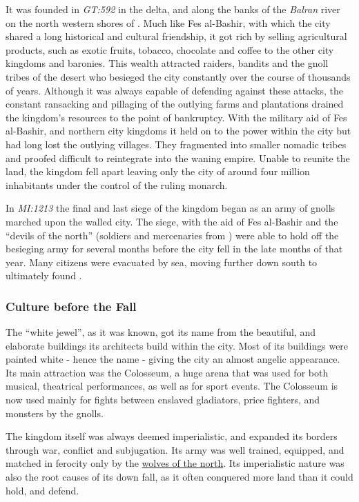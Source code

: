 It was founded in \emph{GT:592} in the delta, and along the banks of the
\emph{Balran} river on the north western shores of . Much
like Fes al-Bashir, with which the city shared a long historical and cultural
friendship, it got rich by selling agricultural products, such as exotic
fruits, tobacco, chocolate and coffee to the other city kingdoms and
baronies. This wealth attracted raiders, bandits and the gnoll tribes of the
desert who besieged the city constantly over the course of thousands of
years. Although it was always capable of defending against these attacks, the
constant ransacking and pillaging of the outlying farms and plantations
drained the kingdom's resources to the point of bankruptcy. With the military
aid of Fes al-Bashir, and northern city kingdoms it held on to the power within
the city but had long lost the outlying villages. They fragmented into smaller
nomadic tribes and proofed difficult to reintegrate into the waning
empire. Unable to reunite the land, the kingdom fell apart leaving only the
city of around four million inhabitants under the control of the ruling
monarch.

In \emph{MI:1213} the final and last siege of the kingdom began as an army of
gnolls marched upon the walled city. The siege, with the aid of Fes al-Bashir
and the ``devils of the north'' (soldiers and mercenaries from
) were able to hold off the besieging army for several
months before the city fell in the late months of that year. Many citizens
were evacuated by sea, moving further down south to ultimately found
.

\subsubsection{Culture before the Fall}

The ``white jewel'', as it was known, got its name from the beautiful, and
elaborate buildings its architects build within the city. Most of its
buildings were painted white - hence the name - giving the city an almost
angelic appearance. Its main attraction was the Colosseum, a huge arena
that was used for both musical, theatrical performances, as well as for
sport events. The Colosseum is now used mainly for fights between enslaved
gladiators, price fighters, and monsters by the gnolls.

The kingdom itself was always deemed imperialistic, and expanded its borders
through war, conflict and subjugation. Its army was well trained, equipped,
and matched in ferocity only by the \hyperref[sec:Norbury]{wolves of the
  north}. Its imperialistic nature was also the root causes of its down fall,
as it often conquered more land than it could hold, and defend.

